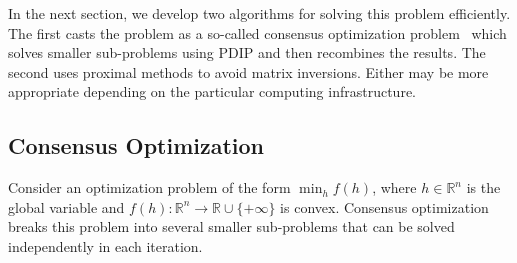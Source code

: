 \documentclass[letterpaper]{article} %
\DeclareMathOperator*{\argmin}{argmin}
\newcommand{\norm}[1]{\left\lVert #1 \right\rVert}
\begin{document}
In the next section, we develop two algorithms for solving this
problem efficiently. The first casts the problem as a
so-called consensus optimization problem~\cite{boyd_distributed_2011}
which solves smaller sub-problems using PDIP and then recombines the results. The
second uses proximal methods to avoid matrix inversions. Either may be more
appropriate depending on the particular computing infrastructure.
 

\subsection{Consensus Optimization}
\label{sec:consOpt}

Consider an optimization problem of the form $\min_h f(h)$, where
$h\in\mathbb{R}^n$ is the global variable and
$f(h):\mathbb{R}^n \rightarrow \mathbb{R}\cup \{+\infty\}$ is
convex. Consensus optimization breaks this problem
into several smaller sub-problems that can be solved independently in
each iteration.  
\end{document}
